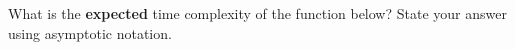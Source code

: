 \Needspace{3.25in}
\begin{prob}
    What is the \textbf{expected} time complexity of the function below? State
    your answer using asymptotic notation. 

    \inputminted{python}{\thisdir/code.py}

\end{prob}
